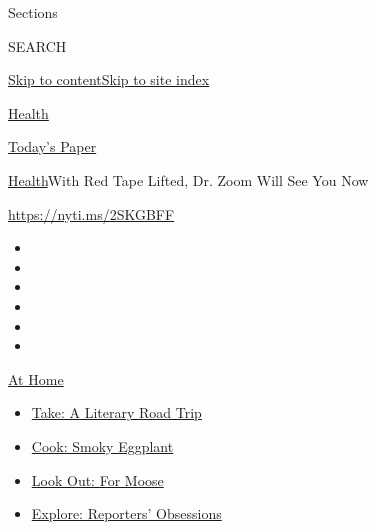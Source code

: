 Sections

SEARCH

\protect\hyperlink{site-content}{Skip to
content}\protect\hyperlink{site-index}{Skip to site index}

\href{https://www.nytimes3xbfgragh.onion/section/health}{Health}

\href{https://myaccount.nytimes3xbfgragh.onion/auth/login?response_type=cookie\&client_id=vi}{}

\href{https://www.nytimes3xbfgragh.onion/section/todayspaper}{Today's
Paper}

\href{/section/health}{Health}\textbar{}With Red Tape Lifted, Dr. Zoom
Will See You Now

\url{https://nyti.ms/2SKGBFF}

\begin{itemize}
\item
\item
\item
\item
\item
\item
\end{itemize}

\href{https://www.nytimes3xbfgragh.onion/spotlight/at-home?action=click\&pgtype=Article\&state=default\&region=TOP_BANNER\&context=at_home_menu}{At
Home}

\begin{itemize}
\tightlist
\item
  \href{https://www.nytimes3xbfgragh.onion/2020/07/28/books/time-for-a-literary-road-trip.html?action=click\&pgtype=Article\&state=default\&region=TOP_BANNER\&context=at_home_menu}{Take:
  A Literary Road Trip}
\item
  \href{https://www.nytimes3xbfgragh.onion/2020/07/29/magazine/bored-with-your-home-cooking-some-smoky-eggplant-will-fix-that.html?action=click\&pgtype=Article\&state=default\&region=TOP_BANNER\&context=at_home_menu}{Cook:
  Smoky Eggplant}
\item
  \href{https://www.nytimes3xbfgragh.onion/2020/07/27/travel/moose-michigan-isle-royale.html?action=click\&pgtype=Article\&state=default\&region=TOP_BANNER\&context=at_home_menu}{Look
  Out: For Moose}
\item
  \href{https://www.nytimes3xbfgragh.onion/interactive/2020/at-home/even-more-reporters-editors-diaries-lists-recommendations.html?action=click\&pgtype=Article\&state=default\&region=TOP_BANNER\&context=at_home_menu}{Explore:
  Reporters' Obsessions}
\end{itemize}

